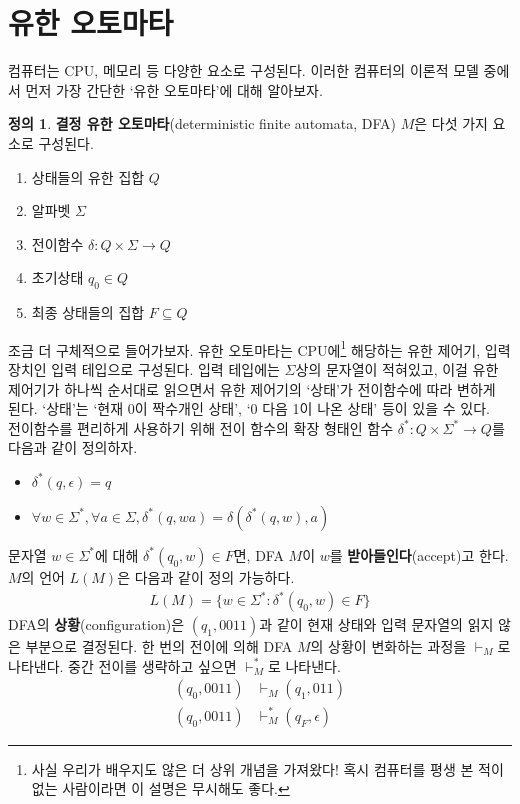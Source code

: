 \documentclass[b5paper, 11pt]{book}
\theoremstyle{definition}
\newtheorem{defn}{정의}[chapter]
\begin{document}
\section{유한 오토마타}
컴퓨터는 CPU, 메모리 등 다양한 요소로 구성된다. 이러한 컴퓨터의 이론적 모델 중에서 먼저 가장 간단한 `유한 오토마타'에 대해 알아보자.
\begin{defn}
    \textbf{결정 유한 오토마타}(deterministic finite automata, DFA) $M$은 다섯 가지
요소로 구성된다.
\begin{enumerate}
    \item 상태들의 유한 집합 $Q$
    \item 알파벳 $\Sigma$
    \item 전이함수 $\delta : Q \times \Sigma \rightarrow Q$
    \item 초기상태 $q_0 \in Q$
    \item 최종 상태들의 집합 $F \subseteq Q$
\end{enumerate}
\end{defn}
조금 더 구체적으로 들어가보자. 유한 오토마타는 CPU에\footnote{사실 우리가 배우지도 않은 더 상위 개념을 가져왔다! 혹시 컴퓨터를 평생 본 적이 없는 사람이라면 이 설명은 무시해도 좋다.} 해당하는 유한 제어기, 입력장치인 입력 테입으로 구성된다. 입력 테입에는 $\Sigma$상의 문자열이 적혀있고, 이걸 유한 제어기가 하나씩 순서대로 읽으면서 유한 제어기의 `상태'가 전이함수에 따라 변하게 된다. `상태'는 `현재 0이 짝수개인 상태', `0 다음 1이 나온 상태' 등이 있을 수 있다. \\
전이함수를 편리하게 사용하기 위해 전이 함수의 확장 형태인 함수 $\delta^*: Q \times \Sigma^{*} 
\rightarrow Q$를 다음과 같이 정의하자.
\begin{itemize}
    \item $\delta^* (q, \epsilon) = q$
    \item $\forall w \in \Sigma^*, \forall a \in \Sigma, \delta^* (q, wa) = \delta(\delta^*(q,w),a)$
\end{itemize}
문자열 $w \in \Sigma^*$에 대해 $\delta^* (q_0, w ) \in F$면, DFA $M$이 $w$를 \textbf{받아들인다}(accept)고 한다. $M$의 언어 $L(M)$은 다음과 같이 정의 가능하다.
\begin{align*}
    L(M) = \{w \in \Sigma^* : \delta^* (q_0, w) \in F \}
\end{align*}
DFA의 \textbf{상황}(configuration)은 $(q_1, 0011)$과 같이 현재 상태와 입력 문자열의 읽지 않은 부분으로 결정된다. 한 번의 전이에 의해 DFA $M$의 상황이 변화하는 과정을 $\vdash_M$로 나타낸다. 중간 전이를 생략하고 싶으면 $\vdash_M^*$로 나타낸다.
\begin{align*}
    (q_0, 0011) &\vdash_M (q_1, 011) \\
    (q_0, 0011) &\vdash_M^* (q_F, \epsilon)
\end{align*}
\end{document}
